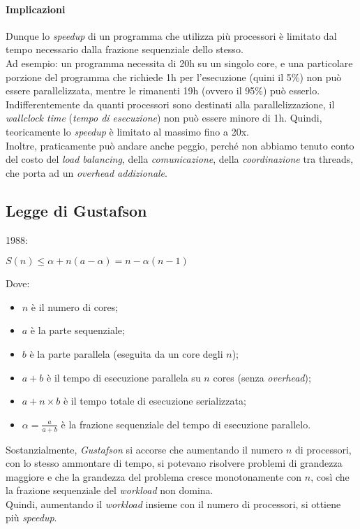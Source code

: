 \paragraph{Implicazioni}
Dunque lo \textit{speedup} di un programma che utilizza più processori è limitato dal tempo necessario dalla frazione sequenziale dello stesso. \\
Ad esempio: un programma necessita di 20h su un singolo core, e una particolare porzione del programma che richiede 1h per l'esecuzione (quini il 5\%) non può essere parallelizzata, mentre le rimanenti 19h (ovvero il 95\%) può esserlo. Indifferentemente da quanti processori sono destinati alla parallelizzazione, il \textit{wallclock time} (\textit{tempo di esecuzione}) non può essere minore di 1h. Quindi, teoricamente lo \textit{speedup} è limitato al massimo fino a 20x. \\
Inoltre, praticamente può andare anche peggio, perché non abbiamo tenuto conto del costo del \textit{load balancing}, della \textit{comunicazione}, della \textit{coordinazione} tra threads, che porta ad un \textit{overhead addizionale}.

\subsection{Legge di Gustafson}
1988:
\begin{center}
	$S(n) \leq \alpha + n(a-\alpha) = n - \alpha (n-1)$
\end{center}
Dove:
\begin{itemize}
	\item $n$ è il numero di cores;
	\item $a$ è la parte sequenziale;
	\item $b$ è la parte parallela (eseguita da un core degli $n$);
	\item $a+b$ è il tempo di esecuzione parallela su $n$ cores (senza \textit{overhead});
	\item $a+n\times b$ è il tempo totale di esecuzione serializzata;
	\item $\alpha = \frac{a}{a+b}$ è la frazione sequenziale del tempo di esecuzione parallelo.
\end{itemize}
Sostanzialmente, \textit{Gustafson} si accorse che aumentando il numero $n$ di processori, con lo stesso ammontare di tempo, si potevano risolvere problemi di grandezza maggiore e che la grandezza del problema cresce monotonamente con $n$, così che la frazione sequenziale del \textit{workload} non domina. \\
Quindi, aumentando il \textit{workload} insieme con il numero di processori, si ottiene più \textit{speedup}.

